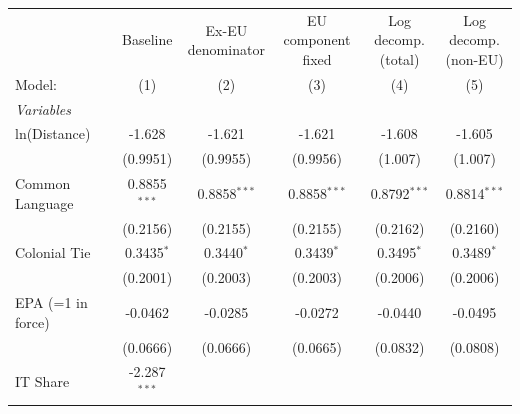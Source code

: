 
\begingroup
\centering
\begin{tabular}{lccccc}
   \tabularnewline \midrule \midrule
                                 & Baseline       & \makecell{Ex-EU\\denominator}    & \makecell{EU component\\fixed}    & \makecell{Log decomp.\\(total)}    & \makecell{Log decomp.\\(non-EU)} \\      
   Model:                        & (1)            & (2)                              & (3)                               & (4)                                & (5)\\  
   \midrule
   \emph{Variables}\\
   ln(Distance)                  & -1.628         & -1.621                           & -1.621                            & -1.608                             & -1.605\\   
                                 & (0.9951)       & (0.9955)                         & (0.9956)                          & (1.007)                            & (1.007)\\   
   Common Language               & 0.8855$^{***}$ & 0.8858$^{***}$                   & 0.8858$^{***}$                    & 0.8792$^{***}$                     & 0.8814$^{***}$\\   
                                 & (0.2156)       & (0.2155)                         & (0.2155)                          & (0.2162)                           & (0.2160)\\   
   Colonial Tie                  & 0.3435$^{*}$   & 0.3440$^{*}$                     & 0.3439$^{*}$                      & 0.3495$^{*}$                       & 0.3489$^{*}$\\   
                                 & (0.2001)       & (0.2003)                         & (0.2003)                          & (0.2006)                           & (0.2006)\\   
   EPA (=1 in force)             & -0.0462        & -0.0285                          & -0.0272                           & -0.0440                            & -0.0495\\   
                                 & (0.0666)       & (0.0666)                         & (0.0665)                          & (0.0832)                           & (0.0808)\\   
   IT Share                      & -2.287$^{***}$ &                                  &                                   &                                    &   \\   

\end{tabular}

